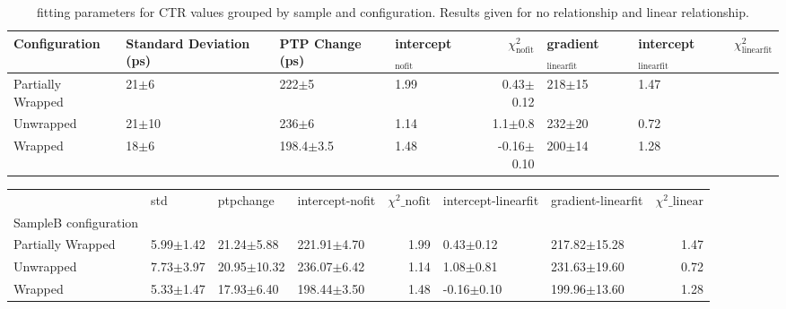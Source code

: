 \begin{table}
\caption{\label{tab:ctrfit-20-results} fitting parameters for CTR values grouped by sample and configuration. Results given for no relationship and linear relationship.}
\begin{tabular}{llllrllr}
\hline
Configuration & Standard Deviation (ps) & PTP Change (ps) & intercept$_\text{nofit}$ &  $\chi^2_\text{nofit}$ & gradient$_\text{linearfit}$ & intercept$_\text{linearfit}$ &  $\chi^2_\text{linearfit}$ \\
\hline
Partially Wrapped   &   21$\pm$6 &       222$\pm$5 &                   1.99 &       0.43$\pm$0.12 &         218$\pm$15 &                    1.47 \\
Unwrapped     &  21$\pm$10 &       236$\pm$6 &                   1.14 &         1.1$\pm$0.8 &         232$\pm$20 &                    0.72 \\
Wrapped       &   18$\pm$6 &   198.4$\pm$3.5 &                   1.48 &      -0.16$\pm$0.10 &         200$\pm$14 &                    1.28 \\
\hline
\end{tabular}
\end{table}

\begin{tabular}{llllrllr}
\toprule
{} &            std &        ptpchange &  intercept-nofit &  $\chi^2\_\text{nofit}$ & intercept-linearfit & gradient-linearfit &  $\chi^2\_\text{linear}$ \\
SampleB configuration &                &                  &                  &                        &                     &                    &                         \\
\midrule
    Partially Wrapped   &  5.99$\pm$1.42 &   21.24$\pm$5.88 &  221.91$\pm$4.70 &                   1.99 &       0.43$\pm$0.12 &   217.82$\pm$15.28 &                    1.47 \\
        Unwrapped     &  7.73$\pm$3.97 &  20.95$\pm$10.32 &  236.07$\pm$6.42 &                   1.14 &       1.08$\pm$0.81 &   231.63$\pm$19.60 &                    0.72 \\
        Wrapped       &  5.33$\pm$1.47 &   17.93$\pm$6.40 &  198.44$\pm$3.50 &                   1.48 &      -0.16$\pm$0.10 &   199.96$\pm$13.60 &                    1.28 \\
\bottomrule
\end{tabular}